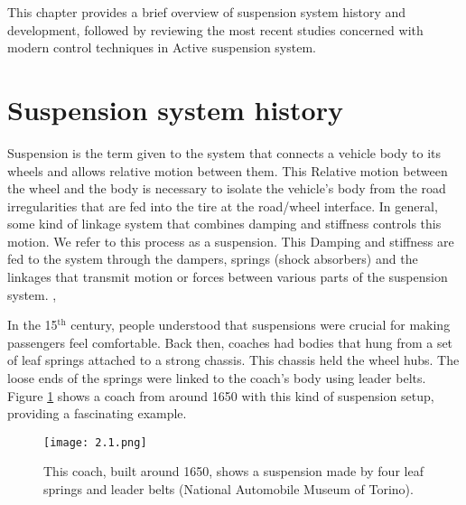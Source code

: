 This chapter provides a brief overview of suspension system history and development, followed by reviewing the most recent studies concerned with modern control techniques in Active suspension system.

\section{Suspension system history}
Suspension is the term given to the system that connects a vehicle body to its wheels and allows relative motion between them. This Relative motion between the wheel and the body is necessary to isolate the vehicle's body from the road irregularities that are fed into the tire at the road/wheel interface. In general, some kind of linkage system that combines damping and stiffness controls this motion. We refer to this process as a suspension. This Damping and stiffness are fed to the system through the dampers, springs (shock absorbers) and the linkages that transmit motion or forces between various parts of the suspension system. \cite{alashtari2023fuzzy}, \cite{barton2018automotive}

In the 15$^{\text{th}}$ century, people understood that suspensions were crucial for making passengers feel comfortable.
Back then, coaches had bodies that hung from a set of leaf springs attached to a strong chassis. This chassis held the wheel hubs. The loose ends of the springs were linked to the coach's body using leader belts. Figure \ref{fig:coach} shows a coach\cite{oliver1981} from around 1650 with this kind of suspension setup, providing a fascinating example. \cite{genta2014motorcar} \cite{anfia2010}

\begin{figure}[H]
	\centering
	\texttt{[image: 2.1.png]}
	\caption{This coach, built around 1650, shows a suspension made by four leaf springs and leader belts (National Automobile Museum of Torino). \cite{genta2014motorcar}
	}
	\label{fig:coach}
\end{figure}


